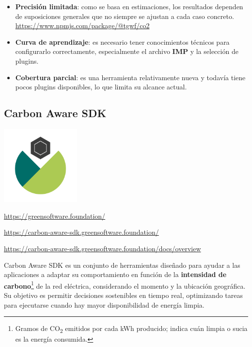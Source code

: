 \documentclass[12pt,a4paper]{report}
\begin{document}
\begin{itemize}
  \item \textbf{Precisión limitada}: como se basa en estimaciones, los resultados dependen de suposiciones generales que no siempre se ajustan a cada caso concreto. \href{https://www.npmjs.com/package/@tgwf/co2}{https://www.npmjs.com/package/@tgwf/co2}
  \item \textbf{Curva de aprendizaje}: es necesario tener conocimientos técnicos para configurarlo correctamente, especialmente el archivo \textbf{IMP} y la selección de plugins.
  \item \textbf{Cobertura parcial}: es una herramienta relativamente nueva y todavía tiene pocos plugins disponibles, lo que limita su alcance actual.
\end{itemize}

\subsection*{Carbon Aware SDK}

\begin{center}
\includegraphics[width=0.3\textwidth]{imagenes/Carbon_Logo.png}
\end{center}

\href{https://greensoftware.foundation/}{https://greensoftware.foundation/}

\href{https://carbon-aware-sdk.greensoftware.foundation/}{https://carbon-aware-sdk.greensoftware.foundation/}

\href{https://carbon-aware-sdk.greensoftware.foundation/docs/overview}{https://carbon-aware-sdk.greensoftware.foundation/docs/overview}

Carbon Aware SDK es un conjunto de herramientas diseñado para ayudar a las
aplicaciones a adaptar su comportamiento en función de la \textbf{intensidad de
  carbono}\footnote{Gramos de CO\textsubscript{2} emitidos por cada kWh
  producido; indica cuán limpia o sucia es la energía consumida.} de la red
eléctrica, considerando el momento y la ubicación geográfica. Su objetivo es
permitir decisiones sostenibles en tiempo real, optimizando tareas para
ejecutarse cuando hay mayor disponibilidad de energía limpia.
\end{document}
